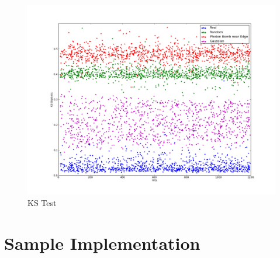 \documentclass{article}
\begin{document}
\begin{figure}[h!]
    \centering
    \includegraphics[width=1.0\linewidth]{../ks_test.png}
    \caption{KS Test}
    \label{ks_test}
\end{figure}

\clearpage
\section{Sample Implementation}
\label{sample}
\begin{multicols}{2}
    \inputminted[mathescape,linenos,numbersep=5pt,framesep=2mm,fontsize=\tiny]
    {python}{snotpos_minimal.py}
\end{multicols}
\end{document}
